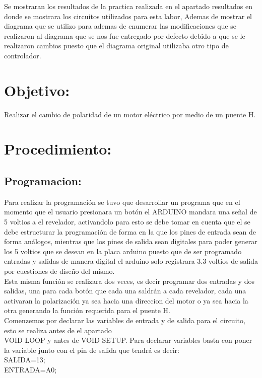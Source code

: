 \documentclass[12pt,a4paper]{article}
\begin{document}
Se mostraran los resultados de la practica realizada en el apartado resultados en donde se mostrara los circuitos utilizados para esta labor, Ademas de mostrar el diagrama que se utilizo para ademas de enumerar las modificaciones que se realizaron al diagrama que se nos fue entregado por defecto debido a que se le realizaron cambios puesto que el diagrama original utilizaba otro tipo de controlador.

\section{Objetivo:}
Realizar el cambio de polaridad de un motor eléctrico por medio de un puente H.

\section{Procedimiento:}

\subsection{Programacion:}

Para realizar la programación se tuvo que desarrollar un programa que en el momento que el usuario presionara un botón el ARDUINO mandara una señal de 5 voltios a el revelador, activandolo para esto se debe tomar en cuenta que el se debe estructurar la programación de forma en la que los pines de entrada sean de forma análogos, mientras que los pines de salida sean digitales para poder generar los 5 voltios que se desean en la placa arduino puesto que de ser programado entradas y salidas de manera digital el arduino solo registrara 3.3 voltios de salida por cuestiones de diseño del mismo.\\
Esta misma función se realizara dos veces, es decir programar dos entradas y dos salidas, una para cada botón que cada una saldrán a cada revelador, cada una activaran la polarización ya sea hacia una direccion del motor o ya sea hacia la otra generando la función requerida para el puente H.\\

Comenzemos por declarar las variables de entrada y de salida para el circuito, esto se realiza antes de el apartado\\ VOID LOOP  y antes de VOID SETUP.
Para declarar variables basta con poner la variable junto con el pin de salida que tendrá es decir:\\
SALIDA=13;\\
ENTRADA=A0;\\
\end{document}
